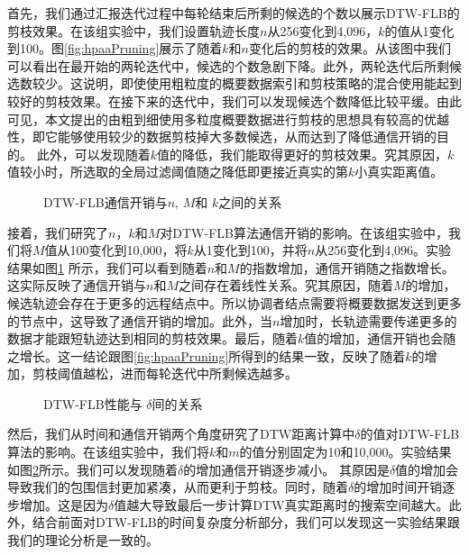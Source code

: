   首先，我们通过汇报迭代过程中每轮结束后所剩的候选的个数以展示DTW-FLB的剪枝效果。在该组实验中，我们设置轨迹长度$n$从256变化到4,096，$k$的值从1变化到100。图\ref{fig:hpaaPruning}展示了随着$k$和$n$变化后的剪枝的效果。从该图中我们可以看出在最开始的两轮迭代中，候选的个数急剧下降。此外，两轮迭代后所剩候选数较少。这说明，即使使用粗粒度的概要数据索引和剪枝策略的混合使用能起到较好的剪枝效果。在接下来的迭代中，我们可以发现候选个数降低比较平缓。由此可见，本文提出的由粗到细使用多粒度概要数据进行剪枝的思想具有较高的优越性，即它能够使用较少的数据剪枝掉大多数候选，从而达到了降低通信开销的目的。
  此外，可以发现随着$k$值的降低，我们能取得更好的剪枝效果。究其原因，$k$值较小时，所选取的全局过滤阈值随之降低即更接近真实的第$k$小真实距离值。
  
  \begin{figure}
  	\centering
  	\caption{DTW-FLB通信开销与$n$, $M$和 $k$之间的关系}
  	\label{fig:hpaaKMn}
  \end{figure}
  
  接着，我们研究了$n$，$k$和$M$对DTW-FLB算法通信开销的影响。在该组实验中，我们将$M$值从100变化到10,000，将$k$从1变化到100，并将$n$从256变化到4,096。实验结果如图\ref{fig:hpaaKMn} 所示，我们可以看到随着$n$和$M$的指数增加，通信开销随之指数增长。这实际反映了通信开销与$n$和$M$之间存在着线性关系。究其原因，随着$M$的增加，候选轨迹会存在于更多的远程结点中。所以协调者结点需要将概要数据发送到更多的节点中，这导致了通信开销的增加。此外，当$n$增加时，长轨迹需要传递更多的数据才能跟短轨迹达到相同的剪枝效果。最后，随着$k$值的增加，通信开销也会随之增长。这一结论跟图\ref{fig:hpaaPruning}所得到的结果一致，反映了随着$k$的增加，剪枝阈值越松，进而每轮迭代中所剩候选越多。
  
  \begin{figure}
  	\centering
  	\caption{DTW-FLB性能与 $\delta$间的关系}
  	\label{fig:DeltaImpact}
  \end{figure}
  
  然后，我们从时间和通信开销两个角度研究了DTW距离计算中$\delta$的值对DTW-FLB算法的影响。在该组实验中，我们将$k$和$m$的值分别固定为10和10,000。实验结果如图\ref{fig:DeltaImpact}所示。我们可以发现随着$\delta$的增加通信开销逐步减小。
  其原因是$\delta$值的增加会导致我们的包围信封更加紧凑，从而更利于剪枝。同时，随着$\delta$的增加时间开销逐步增加。这是因为$\delta$值越大导致最后一步计算DTW真实距离时的搜索空间越大。此外，结合前面对DTW-FLB的时间复杂度分析部分，我们可以发现这一实验结果跟我们的理论分析是一致的。
  
